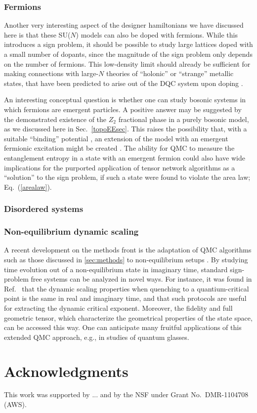 \documentclass[range]{ar2e}
\begin{document}
\subsubsection{Fermions}

Another very interesting aspect of the designer hamiltonians we have discussed here is that these SU($N$) models can also be doped with fermions. While this 
introduces a sign problem, it should be possible to study large lattices doped with a small number of dopants, since the magnitude of the 
sign problem only depends on the number of fermions. This low-density limit should already be sufficient for making connections with 
large-$N$ theories of ``holonic'' or ``strange'' metallic states, that have been predicted to arise out of the DQC system upon 
doping \cite{kaul2008:u1}.

An interesting conceptual question is whether one can study bosonic systems in which fermions are emergent particles.
A positive answer may be suggested by the demonstrated existence of the $Z_2$ fractional phase in a purely bosonic model, as we
discussed here in Sec.~\ref{topoEEsec}. This raises the possibility that, with a suitable ``binding'' potential \cite{FermionBind}, an extension of 
the model with an emergent fermionic excitation might be created \cite{Wenbook}.  
The ability for QMC to measure the entanglement entropy in a state with an emergent fermion
could also have wide implications for the purported application of tensor network algorithms as a ``solution'' to the sign problem, 
if such a state were found to violate the area law; Eq.~(\ref{arealaw}). 

\subsubsection{Disordered systems}


\subsubsection{Non-equilibrium dynamic scaling}

A recent development on the methods front is the adaptation of QMC algorithms such as those discussed in \ref{sec:methods} to non-equilibrium 
setups \cite{Degrandi11}. By studying time evolution out of a non-equilibrium state in imaginary time, standard sign-problem free systems
can be analyzed in novel ways. For instance, it was found in Ref.~\cite{Degrandi11} that the dynamic scaling properties when quenching to
a quantium-critical point is the same in real and imaginary time, and that such protocols are useful for extracting the dynamic critical
exponent. Moreover, the fidelity and full geometric tensor, which characterize the geometrical properties of the state space, can be
accessed this way. One can anticipate many fruitful applications of this extended QMC approach, e.g., in studies of quantum glasses.

\section*{Acknowledgments}

This work was supported by  ... and by the NSF under Grant No.~DMR-1104708 (AWS).



\end{document}
